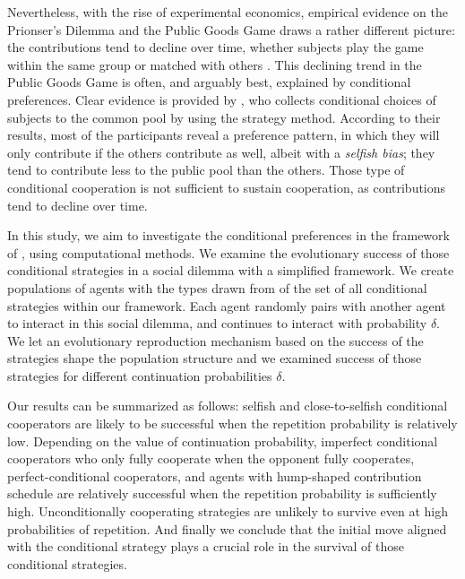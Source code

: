 \documentclass[12pt]{article}
\begin{document}
Nevertheless, with the rise of experimental economics, empirical evidence on the Prionser's Dilemma and the Public Goods Game draws a rather different picture: the contributions tend to decline over time, whether subjects play the game within the same group or matched with others \citep{Selten1986-uc, Andreoni1993-ys, Cooper1996-be, ledyard1994public, Kim1984-wm, Isaac1985-qz, Andreoni2008-ec}. This declining trend in the Public Goods Game is often, and arguably best, explained by conditional preferences. Clear evidence is provided by \citet{Fischbacher2001}, who collects conditional choices of subjects to the common pool by using the strategy method. According to their results, most of the participants reveal a preference pattern, in which they will only contribute if the others contribute as well, albeit with a \textit{selfish bias}; they tend to contribute less to the public pool than the others. Those type of conditional cooperation is not sufficient to sustain cooperation, as contributions tend to decline over time\citep{Fischbacher2010}.

In this study, we aim to investigate the conditional preferences in the framework of \citet{Fischbacher2001}, using computational methods. We examine the evolutionary success of those conditional strategies in a social dilemma with a simplified framework.  We create populations of agents with the types drawn from of the set of all conditional strategies within our framework. Each agent randomly pairs with another agent to interact in this social dilemma, and continues to interact with probability $\delta$. We let an evolutionary reproduction mechanism based on the success of the strategies shape the population structure and we examined success of those strategies for different continuation probabilities $\delta$. 

Our results can be summarized as follows: selfish and close-to-selfish conditional cooperators are likely to be successful when the repetition probability is relatively low. Depending on the value of continuation probability, imperfect conditional cooperators who only fully cooperate when the opponent fully cooperates, perfect-conditional cooperators, and agents with hump-shaped contribution schedule are relatively successful when the repetition probability is sufficiently high. Unconditionally cooperating strategies are unlikely to survive even at high probabilities of repetition. And finally we conclude that the initial move aligned with the conditional strategy plays a crucial role in the survival of those conditional strategies.
\end{document}
